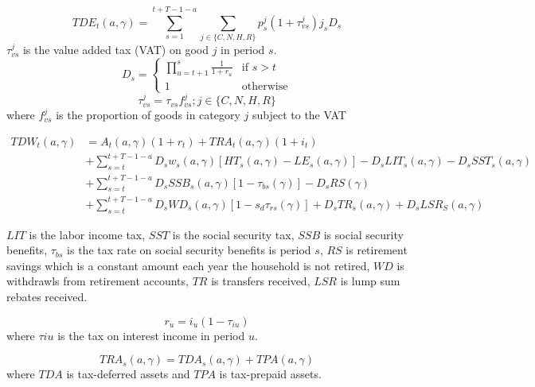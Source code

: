 \documentclass[letterpaper,12pt]{article}
\theoremstyle{definition}
\numberwithin{equation}{section}
\begin{document}
\begin{spacing}{1.5}
  \begin{equation}
  TDE_t(a,\gamma) = \sum_{s=1}^{t+T-1-a} \sum_{j\in\{C,N,H,R\}}p_s^j(1+\tau_{vs}^j)j_s D_s
  \end{equation}
  $\tau_{vs}^j$ is the value added tax (VAT) on good $j$ in period $s$.
  \begin{equation}
  D_s = \left\{ \begin{matrix} \prod_{u=t+1}^s\frac{1}{1+r_u} & \text{if }s>t \\ 1 & \text{otherwise} \end{matrix}\right.
  \end{equation}
  \begin{equation}
  \tau_{vs}^j = \tau_{vs} f_{vs}^j; j\in\{C,N,H,R\}
  \end{equation}
  where $f_{vs}^j$ is the proportion of goods in category $j$ subject to the VAT

  \begin{equation}
  \begin{split}
  TDW_t(a,\gamma) & = A_t(a,\gamma)(1+r_t) + TRA_t(a,\gamma)(1+i_t) \\
  & + \sum_{s=t}^{t+T-1-a} D_s w_s(a,\gamma) [HT_s(a,\gamma) - LE_s(a,\gamma)] - D_s LIT_s(a,\gamma) - D_s SST_s(a,\gamma) \\
  & + \sum_{s=t}^{t+T-1-a} D_s SSB_s(a,\gamma)[1-\tau_{bs}(\gamma)] - D_s RS(\gamma)\\
  & + \sum_{s=t}^{t+T-1-a} D_s WD_s(a,\gamma)[1-s_d\tau_{rs}(\gamma)] + D_s TR_s(a,\gamma) + D_s LSR_S(a,\gamma)
  \end{split}
  \end{equation}

  $LIT$ is the labor income tax, $SST$ is the social security tax, $SSB$ is social security benefits, $\tau_{bs}$ is the tax rate on social security benefits is period $s$, $RS$ is retirement savings which is a constant amount each year the household is not retired, $WD$ is withdrawls from retirement accounts, $TR$ is transfers received, $LSR$ is lump sum rebates received.

  \begin{equation}
  r_u = i_u(1-\tau_{iu})
  \end{equation}
  where $\tau{iu}$ is the tax on interest income in period $u.$

  \begin{equation}
  TRA_s(a,\gamma) = TDA_s(a,\gamma) + TPA(a,\gamma)
  \end{equation}
  where $TDA$ is tax-deferred assets and $TPA$ is tax-prepaid assets.


\end{spacing}
\end{document}
